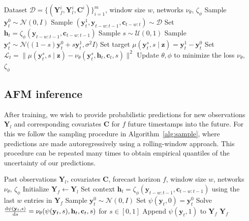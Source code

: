 \documentclass[preprint,12pt,authoryear]{elsarticle}
\begin{document}
\begin{algorithm}[ht]
\caption{AFM training.}\label{alg:train}
\begin{small}
\begin{algorithmic}[1]
\Require Dataset $\mathcal{D}=\{(\mathbf{Y}_f^i,\mathbf{Y}_l^i,\mathbf{C}^i)\}_{i=1}^{m}$, window size $w$, networks $\nu_\theta$, $\zeta_\phi$
        \State Sample $\mathbf{y}_t^0\sim\mathcal{N}(0,I)$
        \State Sample $(\mathbf{y}_t^1,\mathbf{y}_{t-w:t-1},\mathbf{c}_{t-w:t}) \sim \mathcal{D}$
        \State Set $\mathbf{h}_t=\zeta_\phi(\mathbf{y}_{t-w:t-1},\mathbf{c}_{t-w:t-1})$
        \State Sample $s\sim\mathcal{U}(0,1)$
        \State Sample $\mathbf{y}_t^s\sim\mathcal{N}\big((1-s)\mathbf{y}_t^0+s\mathbf{y}_t^1,\sigma^2 I\big)$
        \State Set target $\mu(\mathbf{y}_t^s,s\mid\mathbf{z})=\mathbf{y}_t^1-\mathbf{y}_t^0$
        \State Set  $\mathcal{L}_t=\|\mu(\mathbf{y}_t^s,s\mid\mathbf{z})-\nu_\theta(\mathbf{y}_t^s,\mathbf{h}_t,\mathbf{c}_t,s)\|^2$
        \State Update $\theta,\phi$ to minimize the loss
\EndWhile
\State \Return $\nu_\theta$, $\zeta_\phi$
\end{algorithmic}
\end{small}
\end{algorithm}



\subsection{AFM inference}
After training, we wish to provide probabilistic predictions for new  observations $\mathbf{Y}_l$ and corresponding covariates $\mathbf{C}$ for $f$ future timestamps into the future. 
For this we follow the sampling procedure in Algorithm~\ref{alg:sample}, where predictions are made autoregressively using a rolling-window approach. This procedure can be repeated many times to obtain empirical quantiles of the uncertainty of our predictions.


\begin{algorithm}
\caption{AFM inference.}\label{alg:sample}
\begin{small}
\begin{algorithmic}[1]
\Require Past observations $\mathbf{Y}_l$, covariates $\mathbf{C}$, forecast horizon $f$, window size $w$, networks $\nu_\theta$, $\zeta_\phi$
\State Initialize $\mathbf{Y}_{f} \gets \mathbf{Y}_l$
    \State Set context $\mathbf{h}_t = \zeta_\phi(\mathbf{y}_{t-w:t-1}, \mathbf{c}_{t-w:t-1})$ using the last $w$ entries in $\mathbf{Y}_{f}$
    \State Sample $\mathbf{y}_t^0 \sim \mathcal{N}(0,I)$
    \State Set $\psi(\mathbf{y}_t,0)=\mathbf{y}_t^0$
    \State Solve $
    \dv{\psi(\mathbf{y}_t,s)}{s}=\nu_\theta(\psi(\mathbf{y}_t,s),\mathbf{h}_t,\mathbf{c}_t,s)$ for $s\in[0,1]$
    \State Append $\psi(\mathbf{y}_t,1)$ to $\mathbf{Y}_{f}$
\EndFor
\State \Return $\mathbf{Y}_{f}$
\end{algorithmic}
\end{small}
\end{algorithm}
\end{document}
